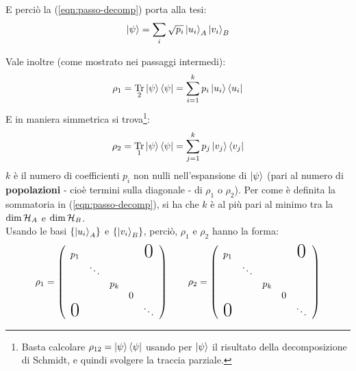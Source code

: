 \documentclass[../../InformazioneQuantistica.tex]{subfiles}
\begin{document}
E perciò la (\ref{eqn:passo-decomp}) porta alla tesi:
\begin{align*}
\Ket{\psi} = \sum_i \sqrt{p_i} \Ket{u_i}_A\Ket{v_i}_B
\end{align*}

Vale inoltre (come mostrato nei passaggi intermedi):
\begin{align*}
\rho_1 = \underset{2}{\operatorname{Tr}}\Ket{\psi}\Bra{\psi} = \sum_{i=1}^k
p_i \Ket{u_i}\Bra{u_i}
\end{align*}
E in maniera simmetrica si trova\footnote{Basta calcolare $\rho_{12} = \Ket{\psi}\Bra{\psi}$ usando per $\Ket{\psi}$ il risultato della decomposizione di Schmidt, e quindi svolgere la traccia parziale.}:
\begin{align*}
\rho_2 = \underset{1}{\operatorname{Tr}} \Ket{\psi}\Bra{\psi} = \sum_{j=1}^k p_{j} \Ket{v_j}\Bra{v_j}
\end{align*}
$k$ è il numero di coefficienti $p_i$ non nulli nell'espansione di $\Ket{\psi}$ (pari al numero di \textbf{popolazioni} - cioè termini sulla diagonale - di $\rho_1$ o $\rho_2$). Per come è definita la sommatoria in (\ref{eqn:passo-decomp}), si ha che $k$ è al più pari al minimo tra la $\operatorname{dim}\mathcal{H}_A$ e $\operatorname{dim}\mathcal{H}_B$.\\
Usando le basi $\{\Ket{u_i}_A\}$ e $\{\Ket{v_i}_B\}$, perciò, $\rho_1$ e $\rho_2$ hanno la forma:
\begin{align*}
\rho_1 = \left(\begin{array}{ccccc}
p_1 & & & & \text{\huge0}  \\
 & \ddots &  & \text{\huge}&  \\
 & & p_k & & \\
 &\text{\huge} & & 0 &  \\
\text{\huge0} & \text{\huge} & & & \ddots
\end{array}
    \right)
    \qquad
\rho_2 = \left(\begin{array}{ccccc}
p_1 & & & & \text{\huge0}  \\
 & \ddots &  & \text{\huge}&  \\
 & & p_k & & \\
 &\text{\huge} & & 0 &  \\
\text{\huge0} & \text{\huge} & & & \ddots
\end{array}
    \right)
\end{align*}
\end{document}
